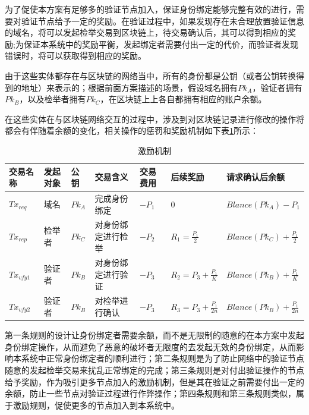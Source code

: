 为了促使本方案有足够多的验证节点加入，保证身份绑定能够完整有效的进行，需要对验证节点给予一定的奖励。在验证过程中，如果发现存在未合理放置验证信息的域名，将可以发起检举交易到区块链上，待交易确认后，其可以得到相应的奖励;为保证本系统中的奖励平衡，发起绑定者需要付出一定的代价，而验证者发现错误时，将可以获取得到相应的奖励。

由于这些实体都存在与区块链的网络当中，所有的身份都是公钥（或者公钥转换得到的地址）来表示的；根据前面方案描述的场景，假设域名拥有$Pk_A$，验证者拥有$Pk_B$，以及检举者拥有$Pk_C$，在区块链上上各自都拥有相应的账户余额。

在这些实体在与区块链网络交互的过程中，涉及到对区块链记录进行修改的操作将都会有伴随着余额的变化，相关操作的惩罚和奖励机制如下表\ref{table:reward}所示：

\begin{table}[h] %
\centering
\begin{tabular}{|p{1cm}|p{1.5cm}|p{1cm}|p{2.5cm}|p{1cm}|p{2.5cm}|p{3.5cm}|} %
 
\hline  
  交易名称 & 发起对象 & 公钥 & 交易含义 & 交易费用 & 后续奖励 & 请求确认后余额\\ %
\hline %
 $Tx_{req}$ & 域名 & $Pk_A$ & 完成身份绑定 & $-P_1$ & 0 & $Blance(Pk_A) - P_1$ \\
 \hline
 $Tx_{rep}$ & 检举者 & $Pk_C$ & 对身份绑定进行检举& $-P_2$ & $R_1 = \frac{P_1}{2}$ & $Blance(Pk_C) + \frac{P_1}{2}$ \\
 \hline
 $Tx_{vfy1}$ & 验证者 & $Pk_B$ & 对身份绑定进行验证& $-P_3$ & $R_2 = P_3 + \frac{P_1}{K}$ &  $Blance(Pk_B) + \frac{P_1}{K}$ \\
 \hline
 $Tx_{vfy2}$ & 验证者 & $Pk_B$ & 对检举进行确认& $-P_3$ & $R_3 = P_3 + \frac{P_1}{2n}$ &  $Blance(Pk_B) + \frac{P_1}{2n}$ \\
 
\hline  
\end{tabular}  
\caption{激励机制}\label{table:reward} %
\end{table} 


第一条规则的设计让身份绑定者需要余额，而不是无限制的随意的在本方案中发起身份绑定操作，从而避免了恶意的破坏者无限度的去发起无效的身份绑定，从而影响本系统中正常身份绑定者的顺利进行；第二条规则是为了防止网络中的验证节点随意的发起检举交易来扰乱正常绑定的完成；第三条规则是对付出验证操作的节点给予奖励，作为吸引更多节点加入的激励机制，但是其在验证之前需要付出一定的余额，防止一些节点对验证过程进行作弊操作；第四条规则和第三条规则类似，属于激励规则，促使更多的节点加入到本系统中。


